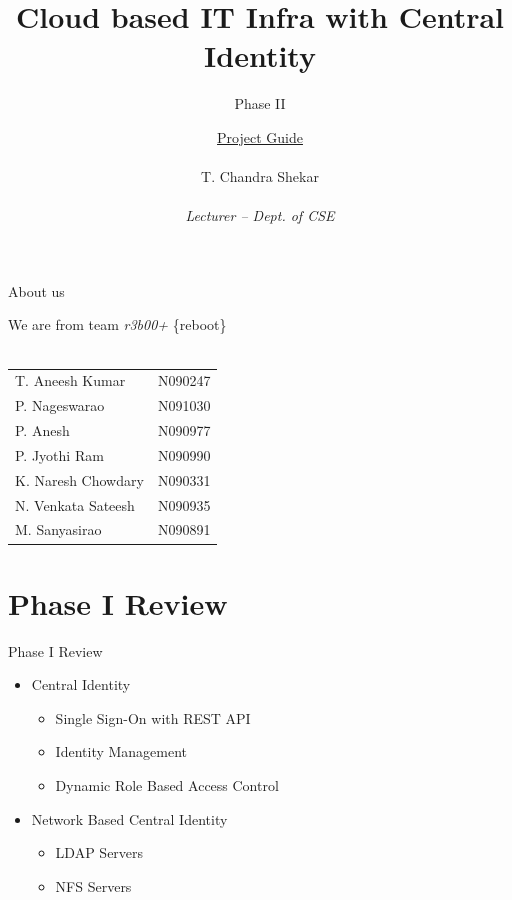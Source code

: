 \documentclass[10pt,xcolor=dvipsnames]{beamer}
\title[Cloud based IT Infra with Central Identity]{Cloud based IT Infra with Central Identity}
\subtitle{Phase II}
\author{ \underline{Project Guide} \\ \hspace{2mm} \\ \small{ T. Chandra Shekar } \tiny \\ \underline{} \\ \scriptsize \textit{Lecturer -- Dept. of CSE} }
\institute{ \underline{Presenting by} \\ \hspace{2mm} \\ \textit {Team r3b00+ }  \\ \hspace{4mm} \\ Dept. of CSE, RGUKT -- Nuzvid}
\begin{document}
\begin{frame}
\titlepage
\end{frame}


\begin{frame}{About us}

\small
\begin{center}
We are from team \textit{r3b00+}  \{reboot\} \\ \hspace{4cm} \\
\begin{tabular}{l  l }
T. Aneesh Kumar & N090247   \\
P. Nageswarao  & N091030  \\
P. Anesh  & N090977 \\
P. Jyothi Ram & N090990 \\
K. Naresh Chowdary  & N090331 \\
N. Venkata Sateesh  & N090935 \\
M. Sanyasirao & N090891  
\end{tabular}

\end{center}

\end{frame}

\section{Phase I Review}
 
\begin{frame}{Phase I Review}
\begin{itemize}
		\item Central Identity
		\begin{itemize}
			\item Single Sign-On with REST API
			\item Identity Management
			\item Dynamic Role Based Access Control
		\end{itemize}
		\item Network Based Central Identity
		\begin{itemize}
			\item LDAP Servers
			\item NFS Servers
		\end{itemize}
\end{itemize}
\end{frame}
\end{document}
